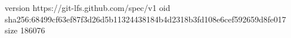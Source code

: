 version https://git-lfs.github.com/spec/v1
oid sha256:68499cf63ef87f3d26d5b11324438184b4d2318b3fd108e6cef592659d8fe017
size 186076

